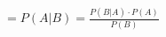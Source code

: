 \documentclass[preview]{standalone}
\begin{document}
\begin{align*}
= P(A|B) = \frac{P(B|A) \cdot P(A)}{P(B)}
\end{align*}
\end{document}
